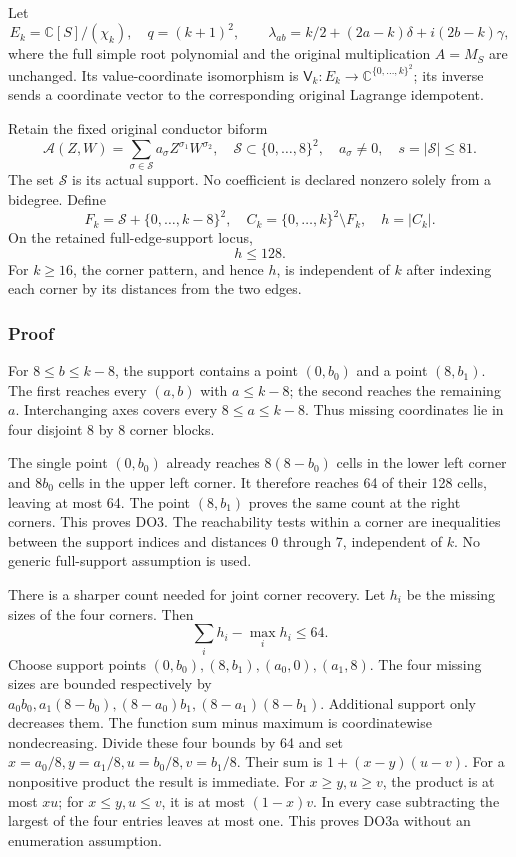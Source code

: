 Let \[
E_k=\mathbb C[S]/(\chi_k),\quad q=(k+1)^2,\qquad
\lambda_{ab}=k/2+(2a-k)\delta+i(2b-k)\gamma,
\] where the full simple root polynomial and the original multiplication \(A=M_S\) are unchanged. Its value-coordinate isomorphism is \(\mathsf V_k:E_k\to\mathbb C^{\{0,\ldots,k\}^2}\); its inverse sends a coordinate vector to the corresponding original Lagrange idempotent.

Retain the fixed original conductor biform \[
\mathcal A(Z,W)=\sum_{\sigma\in\mathcal S}a_\sigma
Z^{\sigma_1}W^{\sigma_2},\quad
\mathcal S\subset\{0,\ldots,8\}^2,\quad a_\sigma\ne0,
\quad s=|\mathcal S|\le81.
\tag{DO1}
\] The set \(\mathcal S\) is its actual support. No coefficient is declared nonzero solely from a bidegree. Define \[
F_k=\mathcal S+\{0,\ldots,k-8\}^2,\quad
C_k=\{0,\ldots,k\}^2\setminus F_k,\quad h=|C_k|.
\tag{DO2}
\] On the retained full-edge-support locus, \[
\boxed{h\le128.}\tag{DO3}
\] For \(k\ge16\), the corner pattern, and hence \(h\), is independent of \(k\) after indexing each corner by its distances from the two edges.

\subsubsection{Proof}\label{pdepth:proof}

For \(8\le b\le k-8\), the support contains a point \((0,b_0)\) and a point \((8,b_1)\). The first reaches every \((a,b)\) with \(a\le k-8\); the second reaches the remaining \(a\). Interchanging axes covers every \(8\le a\le k-8\). Thus missing coordinates lie in four disjoint 8 by 8 corner blocks.

The single point \((0,b_0)\) already reaches \(8(8-b_0)\) cells in the lower left corner and \(8b_0\) cells in the upper left corner. It therefore reaches 64 of their 128 cells, leaving at most 64. The point \((8,b_1)\) proves the same count at the right corners. This proves DO3. The reachability tests within a corner are inequalities between the support indices and distances 0 through 7, independent of \(k\). No generic full-support assumption is used.

There is a sharper count needed for joint corner recovery. Let \(h_i\) be the missing sizes of the four corners. Then \[
\boxed{\sum_i h_i-\max_i h_i\le64.}\tag{DO3a}
\] Choose support points \((0,b_0),(8,b_1),(a_0,0),(a_1,8)\). The four missing sizes are bounded respectively by \(a_0b_0,a_1(8-b_0),(8-a_0)b_1,(8-a_1)(8-b_1)\). Additional support only decreases them. The function sum minus maximum is coordinatewise nondecreasing. Divide these four bounds by 64 and set \(x=a_0/8,y=a_1/8,u=b_0/8,v=b_1/8\). Their sum is \(1+(x-y)(u-v)\). For a nonpositive product the result is immediate. For \(x\ge y,u\ge v\), the product is at most \(xu\); for \(x\le y,u\le v\), it is at most \((1-x)v\). In every case subtracting the largest of the four entries leaves at most one. This proves DO3a without an enumeration assumption.

